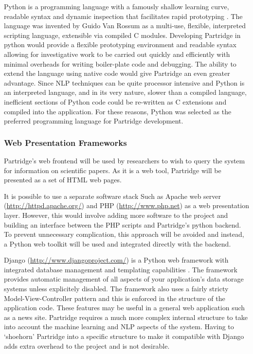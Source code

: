 \documentclass[12pt,a4paper]{article}
\begin{document}
Python is a programming language with a famously shallow learning curve,
readable syntax and dynamic inspection that facilitates rapid prototyping
\cite{bird2009natural}. The language was invented by Guido Van Rossum as a
multi-use, flexible, interpreted scripting language, extensible via compiled C
modules\cite{An93pythonfor}. Developing Partridge in python
would provide a flexible prototyping environment and readable syntax allowing
for investigative work to be carried out quickly and efficiently with minimal
overheads for writing boiler-plate code and debugging. The ability to extend
the language using native code would give Partridge an even greater advantage.
Since NLP techniques can be quite processor intensive and Python is an
interpreted language, and in its very nature, slower than a compiled language,
inefficient sections of Python code could be re-written as C extensions and
compiled into the application. For these reasons, Python was selected as the
preferred programming language for Partridge development.

\subsubsection{Web Presentation Frameworks} 

Partridge's web frontend will be used by researchers to wish to query the
system for information on scientific papers. As it is a web tool, Partridge
will be presented as a set of HTML web pages. 

It is possible to use a separate software stack Such as Apache web server
(\url{http://httpd.apache.org/}) and PHP (\url{http://www.php.net}) as a web
presentation layer. However, this would involve adding more software to the
project and building an interface between the PHP scripts and Partridge's
python backend. To prevent unnecessary complication, this approach will be
avoided and instead, a Python web toolkit will be used and integrated directly
with the backend.

Django (\url{http://www.djangoproject.com/}) is a Python web framework with
integrated database management and templating capabilities \cite{django2012}.
The framework provides automatic management of all aspects of your
application's data storage systems unless explicitely disabled. The framework
also uses a fairly stricty Model-View-Controller pattern and this is enforced
in the structure of the application code. These features may be useful in a
general web application such as a news site. Partridge requires a much more
complex internal structure to take into account the machine learning and NLP
aspects of the system. Having to `shoehorn' Partridge into a specific structure
to make it compatible with Django adds extra overhead to the project and is not
desirable.
\end{document}
